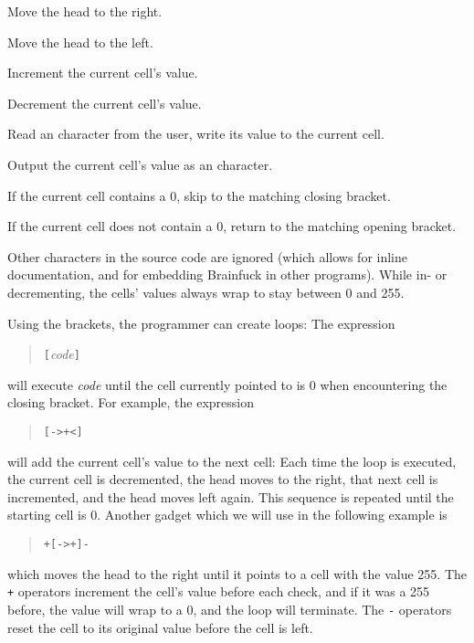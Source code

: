 \begin{description}[labelsep=1em]
    \item[\texttt{>}] Move the head to the right.
    \item[\texttt{<}] Move the head to the left.
    \item[\texttt{+}] Increment the current cell's value.
    \item[\texttt{-}] Decrement the current cell's value.
    \item[\texttt{,}] Read an \ascii{} character from the user, write its value to the current cell.
    \item[\texttt{.}] Output the current cell's value as an \ascii{} character.
    \item[\texttt{[}] If the current cell contains a 0, skip to the matching closing bracket.
    \item[\texttt{]}] If the current cell does not contain a 0, return to the matching opening bracket.
\end{description}

Other characters in the source code are ignored (which allows for inline documentation, and for embedding Brainfuck in other programs). While in- or decrementing, the cells' values always wrap to stay between 0 and 255.

Using the brackets, the programmer can create loops: The expression

\begin{quotation}
    \texttt{[}\textit{code}\texttt{]}
\end{quotation}

will execute \textit{code} until the cell currently pointed to is 0 when encountering the closing bracket. For example, the expression

\begin{quotation}
    \texttt{[->+<]}
\end{quotation}

will add the current cell's value to the next cell: Each time the loop is executed, the current cell is decremented, the head moves to the right, that next cell is incremented, and the head moves left again. This sequence is repeated until the starting cell is 0. Another gadget which we will use in the following example is

\begin{quotation}
    \texttt{+[->+]-}
\end{quotation}

which moves the head to the right until it points to a cell with the value 255. The \texttt{+} operators increment the cell's value before each check, and if it was a 255 before, the value will wrap to a 0, and the loop will terminate. The \texttt{-} operators reset the cell to its original value before the cell is left.

